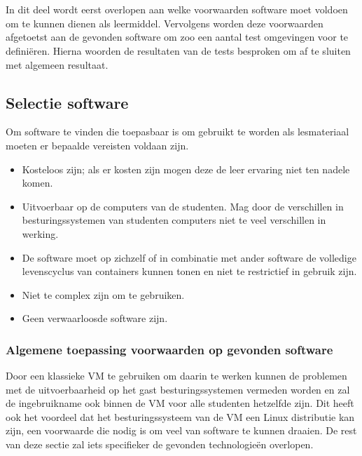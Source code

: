 
\chapter{}
\label{ch:methodologie}
In dit deel wordt eerst overlopen aan welke voorwaarden software moet voldoen om te kunnen dienen als leermiddel. Vervolgens worden deze voorwaarden afgetoetst aan de gevonden software om zoo een aantal test omgevingen voor te definiëren. Hierna woorden de resultaten van de tests besproken om af te sluiten met algemeen resultaat.


\section{Selectie software}
Om software te vinden die toepasbaar is om gebruikt te worden als lesmateriaal moeten er bepaalde vereisten voldaan zijn.

\begin{itemize}
    \item Kosteloos zijn; als er kosten zijn mogen deze de leer ervaring niet ten nadele komen.
    \item Uitvoerbaar op de computers van de studenten. Mag door de verschillen in besturingssystemen van studenten computers niet te veel verschillen in werking.
    \item De software moet op zichzelf of in combinatie met ander software de volledige levenscyclus van containers kunnen tonen en niet te restrictief in gebruik zijn.
    \item Niet te complex zijn om te gebruiken.
    \item Geen verwaarloosde software zijn.
\end{itemize}
    
\subsection{Algemene toepassing voorwaarden op gevonden software}
Door een klassieke VM te gebruiken om daarin te werken kunnen de problemen met de uitvoerbaarheid op het gast besturingssystemen vermeden worden en zal de ingebruikname ook binnen de VM voor alle studenten hetzelfde zijn. Dit heeft ook het voordeel dat het besturingssysteem van de VM een Linux distributie kan zijn, een voorwaarde die nodig is om veel van software te kunnen draaien. De rest van deze sectie zal iets specifieker de gevonden technologieën overlopen.

